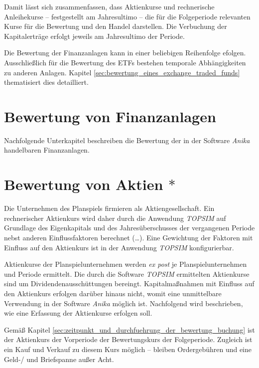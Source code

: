 \documentclass[12pt, a4paper]{article}
\begin{document}
Damit lässt sich zusammenfassen, dass Aktienkurse und rechnerische Anleihekurse -- festgestellt am Jahresultimo -- die für die Folgeperiode relevanten Kurse für die Bewertung und den Handel darstellen. Die Verbuchung der Kapitalerträge erfolgt jeweils am Jahresultimo der Periode.

Die Bewertung der Finanzanlagen kann in einer beliebigen Reihenfolge efolgen. Ausschließlich für die Bewertung des ETFs bestehen temporale Abhängigkeiten zu anderen Anlagen. Kapitel \ref{sec:bewertung_eines_exchange_traded_funds} thematisiert dies detailliert.

\section{Bewertung von Finanzanlagen}
\label{sec:bewertung_von_finanzanlagen}

Nachfolgende Unterkapitel beschreiben die Bewertung der in der Software \textit{Anika} handelbaren Finanzanlagen.

\section{Bewertung von Aktien $\ast$}
\label{sec:bewertung_von_aktien}
Die Unternehmen des Planspiels firmieren als Aktiengesellschaft.
Ein rechnerischer Aktienkurs wird daher durch die Anwendung \textit{TOPSIM} auf Grundlage des Eigenkapitals und des Jahresüberschusses der vergangenen Periode nebst anderen Einflussfaktoren berechnet (\dots). 
Eine Gewichtung der Faktoren mit Einfluss auf den Aktienkurs ist in der Anwendung \textit{TOPSIM} konfigurierbar. 

Aktienkurse der Planspielunternehmen werden \textit{ex post} je Planspielunternehmen und Periode ermittelt. Die durch die Software \textit{TOPSIM} ermittelten Aktienkurse sind um Dividendenausschüttungen bereingt. Kapitalmaßnahmen mit Einfluss auf den Aktienkurs erfolgen darüber hinaus nicht, womit eine unmittelbare Verwendung in der Software \textit{Anika} möglich ist. Nachfolgend wird beschrieben, wie eine Erfassung der Aktienkurse erfolgen soll.

Gemäß Kapitel \ref{sec:zeitpunkt_und_durchfuehrung_der_bewertung_buchung} ist der Aktienkurs der Vorperiode der Bewertungskurs der Folgeperiode.
Zugleich ist ein Kauf und Verkauf zu diesem Kurs möglich -- bleiben Ordergebühren und eine Geld-/ und Briefspanne außer Acht. 

\end{document}
